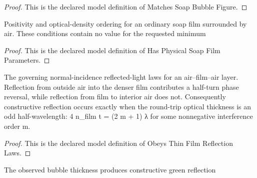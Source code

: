 \begin{proof}
  This is the declared model definition of Matches Soap Bubble Figure.
\end{proof}
\begin{definition}
  \label{def:physics:phyx-mini-0127:phyxminiproblems-problemphyxmini0127-hasphysicalsoapfilmparameters}
  Positivity and optical-density ordering for an ordinary soap film surrounded by air. These conditions contain no value for the requested minimum
\end{definition}
\begin{proof}
  This is the declared model definition of Has Physical Soap Film Parameters.
\end{proof}
\begin{definition}
  \label{def:physics:phyx-mini-0127:phyxminiproblems-problemphyxmini0127-obeysthinfilmreflectionlaws}
  The governing normal-incidence reflected-light laws for an air--film--air layer. Reflection from outside air into the denser film contributes a half-turn phase reversal, while reflection from film to interior air does not. Consequently constructive reflection occurs exactly when the round-trip optical thickness is an odd half-wavelength: 4 n\_film t = (2 m + 1) λ for some nonnegative interference order m.
\end{definition}
\begin{proof}
  This is the declared model definition of Obeys Thin Film Reflection Laws.
\end{proof}
\begin{definition}
  \label{def:physics:phyx-mini-0127:phyxminiproblems-problemphyxmini0127-appearsgreenatnearestpoint}
  The observed bubble thickness produces constructive green reflection
\end{definition}
